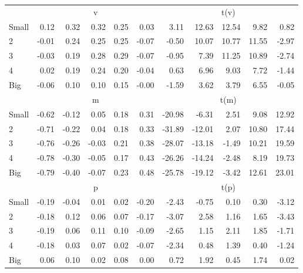 \begin{table}[!ht]
\begin{tabular}{lrrrrrrrrrr}
     & \multicolumn{5}{c}{v} & \multicolumn{5}{c}{t(v)}   \\
     \cmidrule(r){2-6} \cmidrule(r){7-11} 
    Small  & 0.12  & 0.32  & 0.32  & 0.25  & 0.03  & 3.11  & 12.63  & 12.54  & 9.82  & 0.82   \\
    2  & -0.01  & 0.24  & 0.25  & 0.25  & -0.07  & -0.50  & 10.07  & 10.77  & 11.55  & -2.97   \\
    3  & -0.03  & 0.19  & 0.28  & 0.29  & -0.07  & -0.95  & 7.39  & 11.25  & 10.89  & -2.74   \\
    4  & 0.02  & 0.19  & 0.24  & 0.20  & -0.04  & 0.63  & 6.96  & 9.03  & 7.72  & -1.44   \\
    Big  & -0.06  & 0.10  & 0.10  & 0.15  & -0.00  & -1.59  & 3.62  & 3.79  & 6.55  & -0.05   \\
    
  
     & \multicolumn{5}{c}{m} & \multicolumn{5}{c}{t(m)}   \\
     \cmidrule(r){2-6} \cmidrule(r){7-11} 
    Small  & -0.62  & -0.12  & 0.05  & 0.18  & 0.31  & -20.98  & -6.31  & 2.51  & 9.08  & 12.92   \\
    2  & -0.71  & -0.22  & 0.04  & 0.18  & 0.33  & -31.89  & -12.01  & 2.07  & 10.80  & 17.44   \\
    3  & -0.76  & -0.26  & -0.03  & 0.21  & 0.38  & -28.07  & -13.18  & -1.49  & 10.21  & 19.59   \\
    4  & -0.78  & -0.30  & -0.05  & 0.17  & 0.43  & -26.26  & -14.24  & -2.48  & 8.19  & 19.73   \\
    Big  & -0.79  & -0.40  & -0.07  & 0.23  & 0.48  & -25.78  & -19.12  & -3.42  & 12.61  & 23.01   \\
    
  
     & \multicolumn{5}{c}{p} & \multicolumn{5}{c}{t(p)}   \\
     \cmidrule(r){2-6} \cmidrule(r){7-11} 
    Small  & -0.19  & -0.04  & 0.01  & 0.02  & -0.20  & -2.43  & -0.75  & 0.10  & 0.30  & -3.12   \\
    2  & -0.18  & 0.12  & 0.06  & 0.07  & -0.17  & -3.07  & 2.58  & 1.16  & 1.65  & -3.43   \\
    3  & -0.19  & 0.06  & 0.11  & 0.10  & -0.09  & -2.65  & 1.15  & 2.11  & 1.85  & -1.71   \\
    4  & -0.18  & 0.03  & 0.07  & 0.02  & -0.07  & -2.34  & 0.48  & 1.39  & 0.40  & -1.24   \\
    Big  & 0.06  & 0.10  & 0.02  & 0.08  & 0.00  & 0.72  & 1.92  & 0.45  & 1.74  & 0.02   \\
    


\end{tabular}
\end{table}
